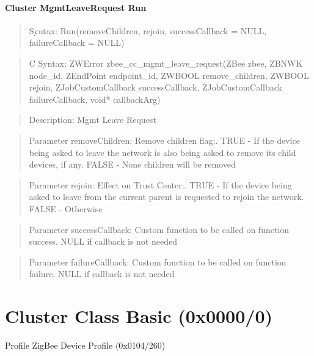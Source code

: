 \paragraph{Cluster MgmtLeaveRequest Run}
\begin{quote}Syntax: Run(removeChildren, rejoin, successCallback = NULL, failureCallback = NULL)\end{quote}
\begin{quote}C Syntax: ZWError zbee\_cc\_mgmt\_leave\_request(ZBee zbee, ZBNWK node\_id, ZEndPoint endpoint\_id, ZWBOOL remove\_children, ZWBOOL rejoin, ZJobCustomCallback successCallback, ZJobCustomCallback failureCallback, void* callbackArg)\end{quote}
\begin{quote}Description: Mgmt Leave Request\end{quote}
\begin{quote}Parameter removeChildren: Remove children flag:. TRUE  - If the device being asked to leave the network is also being asked to remove its child devices, if any. FALSE - None children will be removed\end{quote}
\begin{quote}Parameter rejoin: Effect on Trust Center:. TRUE  - If the device being asked to leave from the current parent is requested to rejoin the network. FALSE - Otherwise\end{quote}
\begin{quote}Parameter successCallback: Custom function to be called on function success. NULL if callback is not needed\end{quote}
\begin{quote}Parameter failureCallback: Custom function to be called on function failure. NULL if callback is not needed\end{quote}



\section{Cluster Class Basic (0x0000/0)}

Profile ZigBee Device Profile (0x0104/260)

